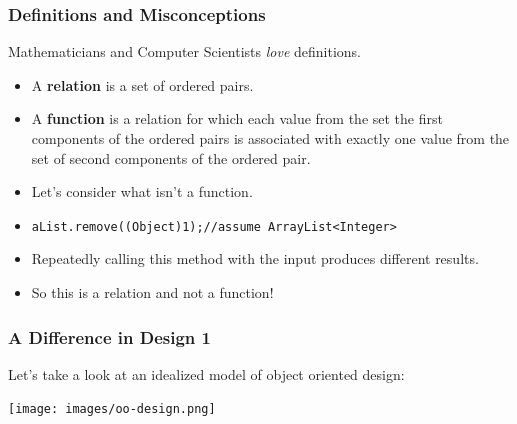 \documentclass{beamer}
\begin{document}

\begin{frame}
  \frametitle{Definitions and Misconceptions}
  Mathematicians and Computer Scientists \emph{love} definitions.
  \begin{itemize}
    \item<2-> A \textbf{relation} is a set of ordered pairs.
    \item<3-> A \textbf{function} is a relation for which each value from the set the first components of the ordered pairs is associated with exactly one value from the set of second components of the ordered pair.
    \item<4-> Let's consider what isn't a function.
    \item<5-> \texttt{aList.remove((Object)1);//assume ArrayList<Integer>}
    \item<6-> Repeatedly calling this method with the input produces
      different results.
    \item<7-> So this is a relation and not a function!
  \end{itemize}
\end{frame}

\begin{frame}
  \frametitle{A Difference in Design 1}
  Let's take a look at an idealized model of object oriented design:
  \pause
  \begin{center}
    \texttt{[image: images/oo-design.png]}
  \end{center}
\end{frame}
\end{document}
